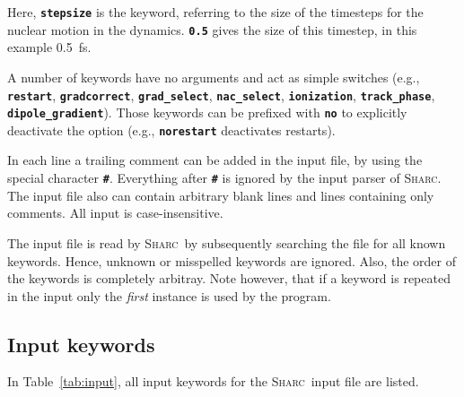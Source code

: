 \documentclass[a4paper,11pt,DIV=15,openany,twoside=false]{scrbook}
\newcommand{\sharc}{\textsc{Sharc}}
\newcommand{\ttt}[1]{\textbf{\texttt{#1}}}
\begin{document}
Here, \ttt{stepsize} is the keyword, referring to the size of the timesteps for the nuclear motion in the dynamics. \ttt{0.5} gives the size of this timestep, in this example 0.5~fs.

A number of keywords have no arguments and act as simple switches (e.g., \ttt{restart}, \ttt{gradcorrect}, \ttt{grad\_select}, \ttt{nac\_select}, \ttt{ionization}, \ttt{track\_phase}, \ttt{dipole\_gradient}). Those keywords can be prefixed with \ttt{no} to explicitly deactivate the option (e.g., \ttt{norestart} deactivates restarts).

In each line a trailing comment can be added in the input file, by using the special character \ttt{\#}. Everything after \ttt{\#} is ignored by the input parser of \sharc. The input file also can contain arbitrary blank lines and lines containing only comments. All input is case-insensitive.

The input file is read by \sharc\ by subsequently searching the file for all known keywords. Hence, unknown or misspelled keywords are ignored. Also, the order of the keywords is completely arbitray. Note however, that if a keyword is repeated in the input only the \textit{first} instance is used by the program. 

\subsection{Input keywords}

In Table~\ref{tab:input}, all input keywords for the \sharc\ input file are listed.
\end{document}
